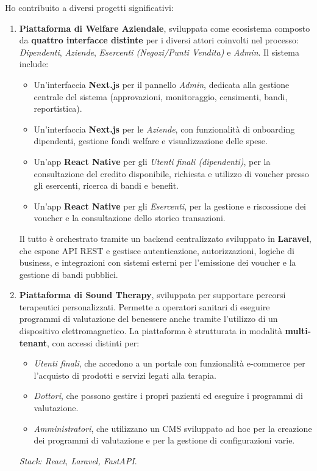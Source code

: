 \begin{experiences}
{\begin{itemize}
		Ho contribuito a diversi progetti significativi:
		
		\begin{enumerate}
		\item \textbf{Piattaforma di Welfare Aziendale}, sviluppata come ecosistema composto da \textbf{quattro interfacce distinte} per i diversi attori coinvolti nel processo: \textit{Dipendenti}, \textit{Aziende}, \textit{Esercenti (Negozi/Punti Vendita)} e \textit{Admin}. Il sistema include:

\begin{itemize}
	\item Un'interfaccia \textbf{Next.js} per il pannello \textit{Admin}, dedicata alla gestione centrale del sistema (approvazioni, monitoraggio, censimenti, bandi, reportistica).
	\item Un'interfaccia \textbf{Next.js} per le \textit{Aziende}, con funzionalità di onboarding dipendenti, gestione fondi welfare e visualizzazione delle spese.
	\item Un'app \textbf{React Native} per gli \textit{Utenti finali (dipendenti)}, per la consultazione del credito disponibile, richiesta e utilizzo di voucher presso gli esercenti, ricerca di bandi e benefit.
	\item Un'app \textbf{React Native} per gli \textit{Esercenti}, per la gestione e riscossione dei voucher e la consultazione dello storico transazioni.
\end{itemize}

Il tutto è orchestrato tramite un backend centralizzato sviluppato in \textbf{Laravel}, che espone API REST e gestisce autenticazione, autorizzazioni, logiche di business, e integrazioni con sistemi esterni per l’emissione dei voucher e la gestione di bandi pubblici. 

			
		\item \textbf{Piattaforma di Sound Therapy}, sviluppata per supportare percorsi terapeutici personalizzati. Permette a operatori sanitari di eseguire programmi di valutazione del benessere anche tramite l'utilizzo di un dispositivo elettromagnetico. La piattaforma è strutturata in modalità \textbf{multi-tenant}, con accessi distinti per:
\begin{itemize}
	\item \textit{Utenti finali}, che accedono a un portale con funzionalità e-commerce per l'acquisto di prodotti e servizi legati alla terapia.
	\item \textit{Dottori}, che possono gestire i propri pazienti ed eseguire i programmi di valutazione.
	\item \textit{Amministratori}, che utilizzano un CMS sviluppato ad hoc per la creazione  dei programmi di valutazione e per la gestione di configurazioni varie. 
\end{itemize}
\textit{Stack: React, Laravel, FastAPI}.


\end{enumerate}
\end{itemize}}
\end{experiences}
